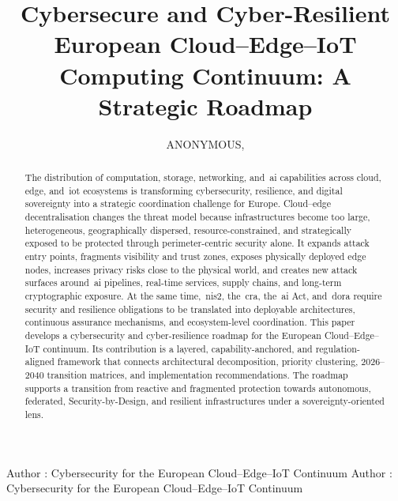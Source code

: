 \documentclass{ieeeaccess}
\begin{document}

\title{Cybersecure and Cyber-Resilient European Cloud--Edge--IoT
Computing Continuum: A Strategic Roadmap}
\author{\uppercase{Anonymous},
}
\address[1]{Affiliation 1 (e-mail: author1@domain)}

\markboth
{Author \headeretal: Cybersecurity for the European Cloud--Edge--IoT Continuum}
{Author \headeretal: Cybersecurity for the European Cloud--Edge--IoT Continuum}


\begin{abstract}
The distribution of computation, storage, networking, and~\gls{ai} capabilities across cloud, edge, and~\gls{iot} ecosystems is transforming cybersecurity, resilience, and digital sovereignty into a strategic coordination challenge for Europe. Cloud--edge decentralisation changes the threat model because infrastructures become too large, heterogeneous, geographically dispersed, resource-constrained, and strategically exposed to be protected through perimeter-centric security alone. It expands attack entry points, fragments visibility and trust zones, exposes physically deployed edge nodes, increases privacy risks close to the physical world, and creates new attack surfaces around~\gls{ai} pipelines, real-time services, supply chains, and long-term cryptographic exposure. At the same time,~\gls{nis2}, the~\gls{cra}, the~\gls{ai} Act, and~\gls{dora} require security and resilience obligations to be translated into deployable architectures, continuous assurance mechanisms, and ecosystem-level coordination. This paper develops a cybersecurity and cyber-resilience roadmap for the European Cloud--Edge--IoT continuum. Its contribution is a layered, capability-anchored, and regulation-aligned framework that connects architectural decomposition, priority clustering, 2026--2040 transition matrices, and implementation recommendations. The roadmap supports a transition from reactive and fragmented protection towards autonomous, federated, Security-by-Design, and resilient infrastructures under a sovereignty-oriented lens.
\end{abstract}
\end{document}
